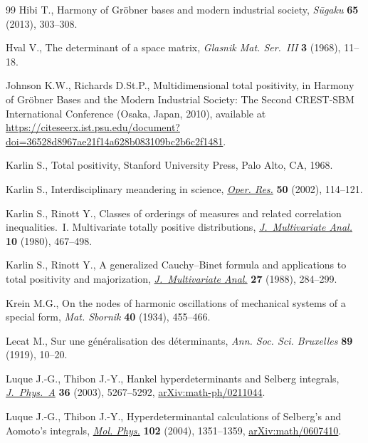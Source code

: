 \documentclass[pdftex]{sigma}
\numberwithin{equation}{section}
\begin{document}
\begin{thebibliography}{99}
Hibi T., Harmony of {G}r\"obner bases and modern industrial society,
 \textit{S\={u}gaku} \textbf{65} (2013), 303--308.

Hval V., The determinant of a space matrix, \textit{Glasnik Mat. Ser.~{III}}
 \textbf{3} (1968), 11--18.

Johnson K.W., Richards D.St.P., Multidimensional total positivity, in Harmony of
 {G}r\"obner {B}ases and the {M}odern {I}ndustrial {S}ociety: {T}he {S}econd
 {CREST}-{SBM} {I}nternational {C}onference (Osaka, Japan, 2010), available at
 \url{https://citeseerx.ist.psu.edu/document?doi=36528d8967ae21f14a628b083109bc2b6c2f1481}.

Karlin S., Total positivity, Stanford University Press, Palo Alto, CA, 1968.

Karlin S., Interdisciplinary meandering in science, \href{https://doi.org/10.1287/opre.50.1.114.17800}{\textit{Oper. Res.}} \textbf{50} (2002), 114--121.

Karlin S., Rinott Y., Classes of orderings of measures and related correlation
 inequalities.~{I}. {M}ultivariate totally positive distributions,
 \href{https://doi.org/10.1016/0047-259X(80)90065-2}{\textit{J.~Multivariate
 Anal.}} \textbf{10} (1980), 467--498.

Karlin S., Rinott Y., A generalized {C}auchy--{B}inet formula and applications
 to total positivity and majorization,
 \href{https://doi.org/10.1016/0047-259X(88)90131-5}{\textit{J.~Multivariate
 Anal.}} \textbf{27} (1988), 284--299.

Krein M.G., On the nodes of harmonic oscillations of mechanical systems of a
 special form, \textit{Mat. Sbornik} \textbf{40} (1934), 455--466.

Lecat M., Sur une g\'en\'eralisation des d\'eterminants, \textit{Ann. Soc. Sci.
 Bruxelles} \textbf{89} (1919), 10--20.

Luque J.-G., Thibon J.-Y., Hankel hyperdeterminants and {S}elberg integrals,
 \href{https://doi.org/10.1088/0305-4470/36/19/306}{\textit{J.~Phys.~A}}
 \textbf{36} (2003), 5267--5292,
 \href{http://arxiv.org/abs/math-ph/0211044}{arXiv:math-ph/0211044}.

Luque J.-G., Thibon J.-Y., Hyperdeterminantal calculations of {S}elberg's and
 {A}omoto's integrals,
 \href{https://doi.org/10.1081/00268970410001728573}{\textit{Mol. Phys.}}
 \textbf{102} (2004), 1351--1359,
 \href{http://arxiv.org/abs/math/0607410}{arXiv:math/0607410}.


\end{thebibliography}
\end{document}
